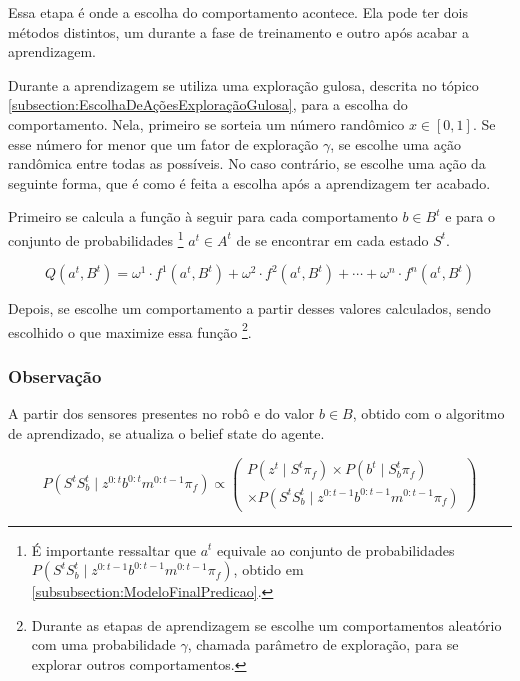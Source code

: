 Essa etapa é onde a escolha do comportamento acontece. Ela pode ter dois métodos distintos, um durante a fase de treinamento e outro após acabar a aprendizagem.

Durante a aprendizagem se utiliza uma exploração gulosa, descrita no tópico \ref{subsection:EscolhaDeAçõesExploraçãoGulosa}, para a escolha do comportamento. Nela, primeiro se sorteia um número randômico $ x \in [0,1] $. Se esse número for menor que um fator de exploração $ \gamma $, se escolhe uma ação randômica entre todas as possíveis. No caso contrário, se escolhe uma ação da seguinte forma, que é como é feita a escolha após a aprendizagem ter acabado.

Primeiro se calcula a função à seguir para cada comportamento $ b \in B^t $ e para o conjunto de probabilidades%
\footnote{É importante ressaltar que $ a^t $ equivale ao conjunto de probabilidades $ P \left( S^t S_b^t \mid z^{0: t-1} b^{0: t-1} m^{0: t-1} \pi_f \right) $, obtido em \ref{subsubsection:ModeloFinalPredicao}.%
} $ a^t \in A^t $ de se encontrar em cada estado $ S^t $.

\begin{equation}
    	Q \left( a^t, B^t \right) = \omega^1 \cdot f^1 \left( a^t, B^t \right) + \omega^2 \cdot f^2 \left( a^t, B^t \right) + \cdots + \omega^n \cdot f^n \left( a^t, B^t \right)
\end{equation}

Depois, se escolhe um comportamento a partir desses valores calculados, sendo escolhido o que maximize essa função%
\footnote{Durante as etapas de aprendizagem se escolhe um comportamentos aleatório com uma probabilidade $ \gamma $, chamada parâmetro de exploração, para se explorar outros comportamentos.}.


\subsubsection{Observação}

A partir dos sensores presentes no robô e do valor $ b \in B $, obtido com o algoritmo de aprendizado, se atualiza o belief state do agente.

\begin{equation}
    P \left( S^t S_b^t \mid z^{0: t} b^{0: t} m^{0: t-1} \pi_f \right) \propto
        \left(
            \begin{array}{l}
                P \left( z^t \mid S^t \pi_f \right) \times P \left( b^t \mid S_b^t \pi_f \right) \\
                \times P \left( S^t S_b^t \mid z^{0: t-1} b^{0: t-1} m^{0: t-1} \pi_f \right)
            \end{array}
        \right)
\end{equation}


